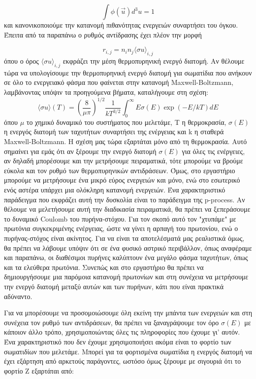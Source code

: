 \begin{equation}
\label{eq54}
\int \phi \left( \vec{u}  \right) d^{3}u = 1
\end{equation} 
και κανονικοποιούμε την κατανομή πιθανότητας ενεργειών συναρτήσει του όγκου. Έπειτα από τα παραπάνω ο ρυθμός αντίδρασης έχει πλέον την μορφή

\begin{equation}
\label{eq55}
r_{i,j}=n_{i}n_{j}\langle \sigma u \rangle_{i,j}
\end{equation}
όπου ο όρος $\langle \sigma u \rangle_{i,j}$ εκφράζει την μέση θερμοπυρηνική ενεργό διατομή. Αν θέλουμε τώρα να υπολογίσουμε την θερμοπυρηνική ενεργό διατομή για σωματίδια που ανήκουν σε όλο το ενεργειακό φάσμα που φαίνεται στην κατανομή Maxwell-Boltzmann, λαμβάνοντας υπόψιν τα προηγούμενα βήματα, καταλήγουμε στη σχέση:
\begin{equation}
\label{eq56}
\langle \sigma u \rangle (T) = \left(  \frac{8}{\mu \pi} \right)^{1/2} \frac{1}{kT^{3/2}} \int_{0}^{\infty} E \sigma(E) \exp (-E/kT)dE
\end{equation}
όπου $\mu$ το χημικό δυναμικό του συστήματος που μελετάμε, Τ η θερμοκρασία, $\sigma(E)$ η ενεργός διατομή των ταχυτήτων συναρτήσει της ενέργειας και k η σταθερά Maxwell-Boltzmann.
Η σχέση μας τώρα εξαρτάται μόνο από τη θερμοκρασία. Αυτό σημαίνει για εμάς ότι αν ξέρουμε την ενεργό διατομή $\sigma(E)$ για όλες τις ενέργειες, αν δηλαδή μπορέσουμε και την μετρήσουμε πειραματικά, τότε μπορούμε να βρούμε εύκολα και τον ρυθμό των θερμοπυρηνικών αντιδράσεων. Όμως, στο εργαστήριο μπορούμε να μετρήσουμε ένα μικρό εύρος ενεργειών και μόνο, ενώ στο εσωτερικό ενός αστέρα υπάρχει μια ολόκληρη κατανομή ενεργειών. Ένα χαρακτηριστικό παράδειγμα που εκφράζει αυτή την δυσκολία είναι το παράδειγμα της p-process. Αν θέλουμε να μελετήσουμε αυτή την διαδικασία πειραματικά, θα πρέπει να ξεπεράσουμε το δυναμικό Coulomb του πυρήνα-στόχου. Για τον σκοπό αυτό τον "χτυπάμε" με πρωτόνια συγκεκριμένης ενέργειας, ώστε να γίνει η αρπαγή του πρωτονίου, ενώ ο πυρήνας-στόχος είναι ακίνητος. Για να είναι τα αποτελέσματά μας ρεαλιστικά όμως, θα πρέπει να λάβουμε υπόψιν ότι σε ένα φυσικό αστρικό περιβάλλον, όπως αναφέραμε και παραπάνω, οι διαθέσιμοι πυρήνες καλύπτουν ένα μεγάλο φάσμα ταχυτήτων, όπως και τα ελεύθερα πρωτόνια. Συνεπώς και στο εργαστήριο θα πρέπει να δημιουργήσουμε μια παρόμοια κατανομή πρωτονίων και στη συνέχεια να μετρήσουμε την ενεργό διατομή μεταξύ αυτών και των πυρήνων, κάτι που είναι πρακτικά αδύναντο.

 Για να μπορέσουμε να προσομοιώσουμε όλη εκείνη την μπάντα των ενεργειών και στη συνέχεια τον ρυθμό των αντιδράσεων, θα πρέπει να ξαναγράψουμε τον όρο $\sigma(E)$ με κάποιον άλλο τρόπο, χρησιμοποιώντας όλες τις πληροφορίες που έχουμε γι' αυτόν. Ένα χαρακτηριστικό που δεν έχουμε χρησιμοποιήσει ακόμα είναι το φορτίο των σωματιδίων που μελετάμε. Μπορεί για τα φορτισμένα σωματίδια η ενεργός διατομή να έχει εξάρτηση από αρκετούς παράγοντες, ωστόσο όμως ξέρουμε με σιγουριά ότι το φορτίο Ζ εξαρτάται από:
 
